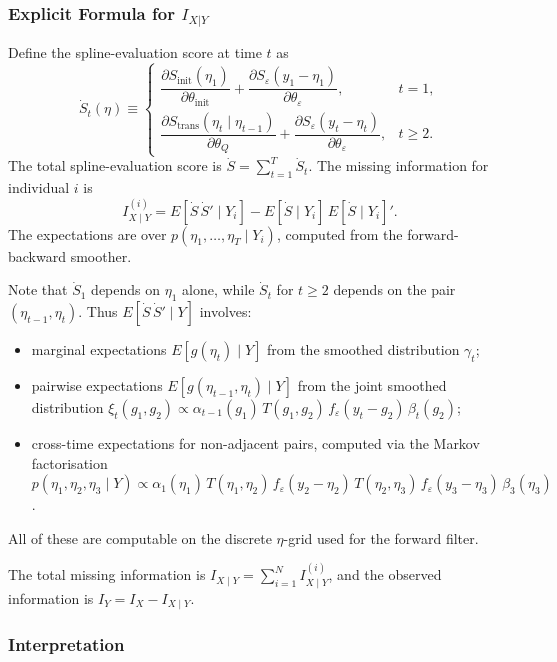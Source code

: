 \documentclass[12pt]{article}
\begin{document}
\subsubsection*{Explicit Formula for $I_{X|Y}$}

Define the spline-evaluation score at time $t$ as
\[
\dot{S}_t(\eta) \equiv
\begin{cases}
\dfrac{\partial S_{\text{init}}(\eta_1)}{\partial \theta_{\text{init}}}
+ \dfrac{\partial S_\varepsilon(y_1 - \eta_1)}{\partial \theta_\varepsilon},
& t = 1, \\[6pt]
\dfrac{\partial S_{\text{trans}}(\eta_t \mid \eta_{t-1})}{\partial \theta_Q}
+ \dfrac{\partial S_\varepsilon(y_t - \eta_t)}{\partial \theta_\varepsilon},
& t \ge 2.
\end{cases}
\]
The total spline-evaluation score is $\dot{S} = \sum_{t=1}^T \dot{S}_t$.
The missing information for individual $i$ is
\begin{equation}\label{eq:missing_info}
I_{X \mid Y}^{(i)} = E[\dot{S}\,\dot{S}' \mid Y_i]
- E[\dot{S} \mid Y_i]\, E[\dot{S} \mid Y_i]'.
\end{equation}
The expectations are over $p(\eta_1, \ldots, \eta_T \mid Y_i)$, computed
from the forward-backward smoother.

Note that $\dot{S}_1$ depends on $\eta_1$ alone, while $\dot{S}_t$ for
$t \ge 2$ depends on the pair $(\eta_{t-1}, \eta_t)$.
Thus $E[\dot{S}\,\dot{S}' \mid Y]$ involves:
\begin{itemize}
\item marginal expectations $E[g(\eta_t) \mid Y]$ from the smoothed
  distribution $\gamma_t$;
\item pairwise expectations $E[g(\eta_{t-1}, \eta_t) \mid Y]$ from
  the joint smoothed distribution
  $\xi_t(g_1, g_2) \propto \alpha_{t-1}(g_1)\, T(g_1, g_2)\,
  f_\varepsilon(y_t - g_2)\, \beta_t(g_2)$;
\item cross-time expectations for non-adjacent pairs, computed via
  the Markov factorisation
  $p(\eta_1, \eta_2, \eta_3 \mid Y) \propto
  \alpha_1(\eta_1)\, T(\eta_1,\eta_2)\, f_\varepsilon(y_2-\eta_2)\,
  T(\eta_2,\eta_3)\, f_\varepsilon(y_3-\eta_3)\, \beta_3(\eta_3)$.
\end{itemize}
All of these are computable on the discrete $\eta$-grid used for the
forward filter.

The total missing information is $I_{X \mid Y} = \sum_{i=1}^N I_{X \mid Y}^{(i)}$,
and the observed information is $I_Y = I_X - I_{X \mid Y}$.

\subsubsection*{Interpretation}
\end{document}
